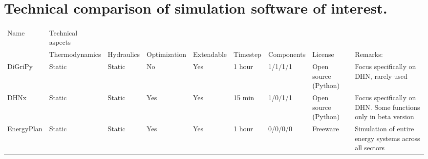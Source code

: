 \chapter{Technical comparison of simulation software of interest.}
\label{chapter:appendixTable}

\newpage 
\begin{landscape}
\thispagestyle{plain}
\begin{table}[h!]
\fontsize{8pt}{7.5pt}\selectfont
\begin{tabular}{M{3cm}M{3cm}M{1.8cm}M{2.2cm}M{2cm}M{1.5cm}M{2.3cm}M{2cm}p{3cm}}
\hline
Name           & Technical aspects                                            &                      &                  &            &                       &             &                                                                   &                                                                                                                \\  
               & Thermodynamics & Hydraulics    & Optimization\footnotemark[1] & Extendable & Timestep & Components\footnotemark[2] & License                                                           & Remarks:                                                                                                       \\ \hline
DiGriPy \cite{DIGRIPY}  & Static                                                       & Static               & No  & Yes & 1 hour                & 1/1/1/1     & Open source (Python)                                              & Focus specifically on DHN, rarely used                                                                         \\
DHNx \cite{DHNX}          & Static                                                       & Static               & Yes & Yes & 15 min                & 1/0/1/1     & Open source (Python)                                              & Focus specifically on DHN. Some functions only in beta version                                                 \\
EnergyPlan \cite{EnergyPlan}    & Static & Static               & Yes  & Yes & 1 hour                & 0/0/0/0     & Freeware                                                          & Simulation of entire energy systems across all sectors                                                         \\

\end{tabular}
\end{table}
\end{landscape}
